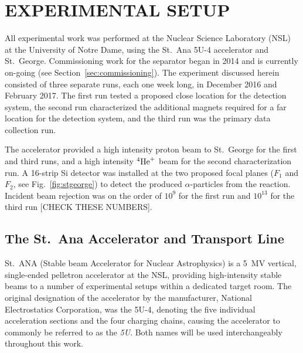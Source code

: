 \chapter{EXPERIMENTAL SETUP}
\label{ch:02-experimental-setup}


All experimental work was performed at the Nuclear Science Laboratory
(NSL) at the University of Notre Dame, using the St.\ Ana 5U-4
accelerator and St.\ George. Commissioning work for the separator began
in 2014 and is currently on-going (see Section~\ref{sec:commissioning}).
The experiment discussed herein consisted of three separate runs, each
one week long, in December 2016 and February 2017. The first run tested
a proposed close location for the detection system, the second run
characterized the additional magnets required for a far location for the
detection system, and the third run was the primary data collection run.

The accelerator provided a high intensity proton beam to St.\ George for
the first and third runs, and a high intensity ${}^{4}\textrm{He}^{+}$ beam
for the second characterization run. A 16-strip Si detector was
installed at the two proposed focal planes ($F_1$ and $F_2$, see
Fig.~\ref{fig:stgeorge}) to detect the produced $\alpha$-particles from
the \alpa{} reaction. Incident beam rejection was on the order of $10^9$
for the first run and $10^{13}$ for the third run [CHECK THESE NUMBERS].


\section{The St.\ Ana Accelerator and Transport Line}
\label{sec:ch02-5U}

St.\ ANA (Stable beam Accelerator for Nuclear Astrophysics) is a 5~MV
vertical, single-ended pelletron accelerator at the NSL, providing
high-intensity stable beams to a number of experimental setups within a
dedicated target room. The original designation of the accelerator by
the manufacturer, National Electrostatics Corporation, was the 5U-4,
denoting the five individual acceleration sections and the four charging
chains, causing the accelerator to commonly be referred to as the
\textit{5U}. Both names will be used interchangeably throughout this
work.

